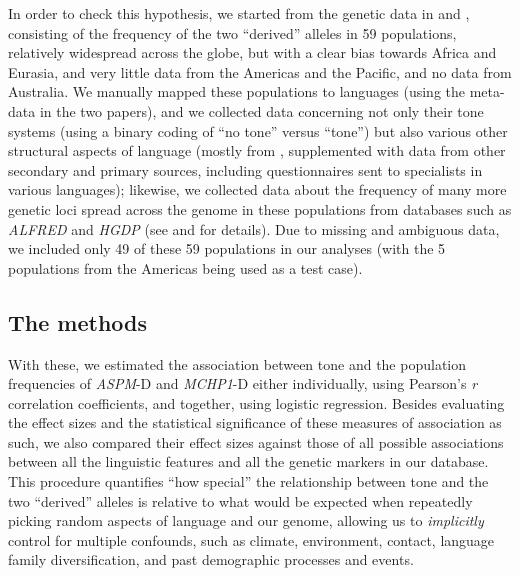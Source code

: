 \documentclass[twoside,onecolumn]{article}
\begin{document}
In order to check this hypothesis, we started from the genetic data in \citet{evans_microcephalin_2005} and \citet{mekelbobrov_aspm_2005}, consisting of the frequency of the two ``derived'' alleles in 59 populations, relatively widespread across the globe, but with a clear bias towards Africa and Eurasia, and very little data from the Americas and the Pacific, and no data from Australia.
We manually mapped these populations to languages (using the meta-data in the two papers), and we collected data concerning not only their tone systems (using a binary coding of ``no tone'' versus ``tone'') but also various other structural aspects of language (mostly from \citealp{haspelmath_wals_2005}, supplemented with data from other secondary and primary sources, including questionnaires sent to specialists in various languages); likewise, we collected data about the frequency of many more genetic loci spread across the genome in these populations from databases such as \textit{ALFRED} \citep{rajeevan_alfred_2003} and \textit{HGDP} \citep{cavallisforza_hdgp_2005} (see \citealp{dediu_ladd_2007} and \citealp{dediu_phd_2007} for details).
Due to missing and ambiguous data, we included only 49 of these 59 populations in our analyses (with the 5 populations from the Americas being used as a test case).

\subsection{The methods}

With these, we estimated the association between tone and the population frequencies of \textit{ASPM}-D and \textit{MCHP1}-D either individually, using Pearson’s \textit{r} correlation coefficients, and together, using logistic regression.
Besides evaluating the effect sizes and the statistical significance of these measures of association as such, we also compared their effect sizes against those of all possible associations between all the linguistic features and all the genetic markers in our database.
This procedure quantifies ``how special'' the relationship between tone and the two ``derived'' alleles is relative to what would be expected when repeatedly picking random aspects of language and our genome, allowing us to \emph{implicitly} control for multiple confounds, such as climate, environment, contact, language family diversification, and past demographic processes and events.
\end{document}
